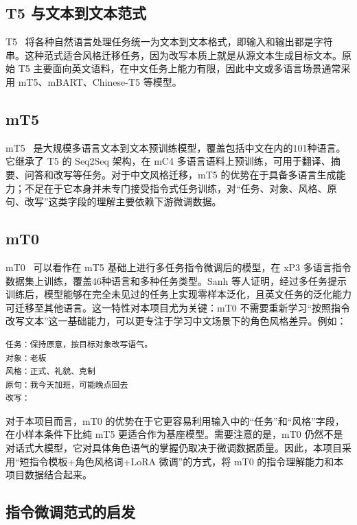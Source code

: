 \documentclass[12pt,a4paper]{ctexart}
\begin{document}
\subsection{T5 与文本到文本范式}

T5~\cite{raffel2020t5} 将各种自然语言处理任务统一为文本到文本格式，即输入和输出都是字符串。这种范式适合风格迁移任务，因为改写本质上就是从源文本生成目标文本。原始 T5 主要面向英文语料，在中文任务上能力有限，因此中文或多语言场景通常采用 mT5、mBART、Chinese-T5 等模型。

\subsection{mT5}

mT5~\cite{xue2021mt5} 是大规模多语言文本到文本预训练模型，覆盖包括中文在内的101种语言。它继承了 T5 的 Seq2Seq 架构，在 mC4 多语言语料上预训练，可用于翻译、摘要、问答和改写等任务。对于中文风格迁移，mT5 的优势在于具备多语言生成能力；不足在于它本身并未专门接受指令式任务训练，对“任务、对象、风格、原句、改写”这类字段的理解主要依赖下游微调数据。

\subsection{mT0}

mT0~\cite{sanh2022mt0} 可以看作在 mT5 基础上进行多任务指令微调后的模型，在 xP3 多语言指令数据集上训练，覆盖46种语言和多种任务类型。Sanh 等人证明，经过多任务提示训练后，模型能够在完全未见过的任务上实现零样本泛化，且英文任务的泛化能力可迁移至其他语言。这一特性对本项目尤为关键：mT0 不需要重新学习“按照指令改写文本”这一基础能力，可以更专注于学习中文场景下的角色风格差异。例如：

\begin{lstlisting}[language={}]
任务：保持原意，按目标对象改写语气。
对象：老板
风格：正式、礼貌、克制
原句：我今天加班，可能晚点回去
改写：
\end{lstlisting}

对于本项目而言，mT0 的优势在于它更容易利用输入中的“任务”和“风格”字段，在小样本条件下比纯 mT5 更适合作为基座模型。需要注意的是，mT0 仍然不是对话式大模型，它对具体角色语气的掌握仍取决于微调数据质量。因此，本项目采用“短指令模板+角色风格词+LoRA 微调”的方式，将 mT0 的指令理解能力和本项目数据结合起来。

\subsection{指令微调范式的启发}
\end{document}
